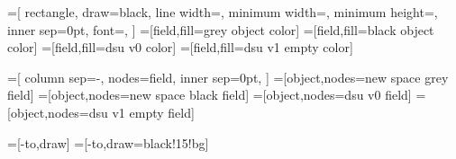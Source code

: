 

\newlength{\drawthickness}
\setlength{\drawthickness}{0.6pt}
\newlength{\fielddimension}
\setlength{\fielddimension}{5mm}
=[
    rectangle,
    draw=black,
    line width=\drawthickness,
    minimum width=\fielddimension,
    minimum height=\fielddimension,
    inner sep=0pt,
    font=\tiny,
]
=[field,fill=grey object color]
=[field,fill=black object color]
=[field,fill=dsu v0 color]
=[field,fill=dsu v1 empty color]

=[
    column sep=-\drawthickness,
    nodes=field,
    inner sep=0pt,
]
=[object,nodes=new space grey field]
=[object,nodes=new space black field]
=[object,nodes=dsu v0 field]
=[object,nodes=dsu v1 empty field]

=[-to,draw]
=[-to,draw=black!15!bg]

\newcommand{\twoFieldsObject}[3]{%
\matrix[#3,ampersand replacement=\&] (#1) at #2 {
  \node (#1 0) {}; \& \node (#1 1) {}; \\
};}
\newcommand{\fourFieldsObject}[3]{%
\matrix[#3,ampersand replacement=\&] (#1) at #2 {
  \node (#1 0) {}; \& \node (#1 1) {}; \& \node (#1 2) {}; \& \node (#1 3) {}; \\
};}


